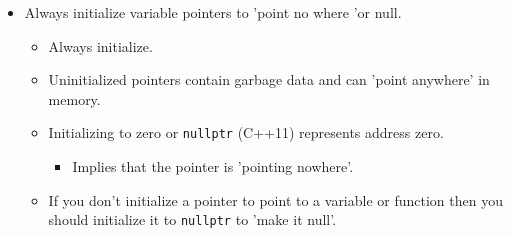 \begin{itemize}
    \item Always initialize variable pointers to 'point no where 'or null.
        \begin{itemize}
            \item Always initialize.
            \item Uninitialized pointers contain garbage data and can 'point anywhere' in memory.
            \item Initializing to zero or \texttt{nullptr} (C++11) represents address zero.
                \begin{itemize}
                    \item Implies that the pointer is 'pointing nowhere'.
                \end{itemize}
            
            \item If you don't initialize a pointer to point to a variable or function then you should initialize it to \texttt{nullptr} to 'make it null'.
        \end{itemize}
\end{itemize}


